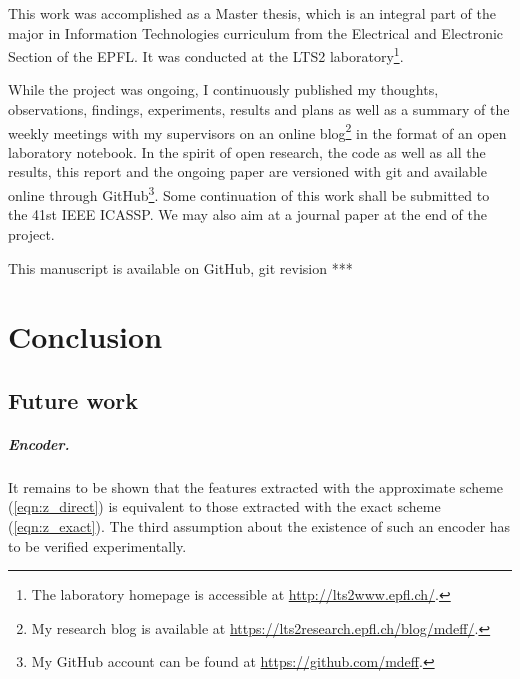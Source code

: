 \documentclass[a4paper,12pt,twoside]{report}
\newcommand{\eqnref}[1]{(\ref{eqn:#1})}  %
\begin{document}
This work was accomplished as a Master thesis, which is an integral part of the major in Information Technologies curriculum from the Electrical and Electronic Section of the \gls{EPFL}. It was conducted at the LTS2 laboratory\footnote{The laboratory homepage is accessible at \url{http://lts2www.epfl.ch/}.}.

While the project was ongoing, I continuously published my thoughts, observations, findings, experiments, results and plans as well as a summary of the weekly meetings with my supervisors on an online blog\footnote{My research blog is available at \url{https://lts2research.epfl.ch/blog/mdeff/}.} in the format of an open laboratory notebook. In the spirit of open research, the code as well as all the results, this report and the ongoing paper are versioned with git and available online through GitHub\footnote{My GitHub account can be found at \url{https://github.com/mdeff}.}. Some continuation of this work shall be submitted to the 41st IEEE \gls{ICASSP}. We may also aim at a journal paper at the end of the project.

This manuscript is available on GitHub, git revision ***










\chapter*{Conclusion}

\section*{Future work}

\paragraph{Encoder.}
It remains to be shown that the features extracted with the approximate scheme \eqnref{z_direct} is equivalent to those extracted with the exact scheme \eqnref{z_exact}.
The third assumption about the existence of such an encoder has to be verified experimentally. %
\end{document}
